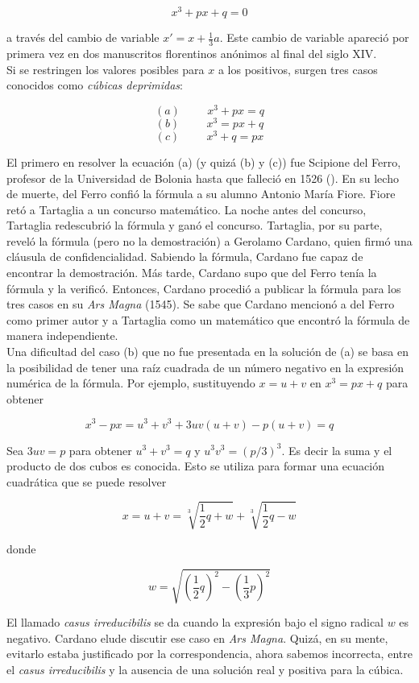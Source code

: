 \documentclass[../main.tex]{memoir}
\begin{document}
$$x^3+px+q = 0$$

a través del cambio de variable $x'  = x + \frac{1}{3}a$. Este cambio de variable apareció por primera vez en dos manuscritos florentinos anónimos al final del siglo XIV. \\

Si se restringen los valores posibles para $x$ a los positivos, surgen tres casos conocidos como \textit{cúbicas deprimidas}:

$$ (a) \hspace{1cm} x^3+px = q $$
$$ (b) \hspace{1cm} x^3 = px+q $$
$$ (c) \hspace{1cm} x^3+q = px $$

El primero en resolver la ecuación (a) (y quizá (b) y (c)) fue Scipione del Ferro, profesor de la Universidad de Bolonia hasta que falleció en 1526 (\cite{mactutor}). En su lecho de muerte, del Ferro confió la fórmula a su alumno Antonio María Fiore. Fiore retó a Tartaglia a un concurso matemático. La noche antes del concurso, Tartaglia redescubrió la fórmula y ganó el concurso. Tartaglia, por su parte, reveló la fórmula (pero no la demostración) a Gerolamo Cardano, quien firmó una cláusula de confidencialidad. Sabiendo la fórmula, Cardano fue capaz de encontrar la demostración. Más tarde, Cardano supo que del Ferro tenía la fórmula y la verificó. Entonces, Cardano procedió a publicar la fórmula para los tres casos en su \textit{Ars Magna} (1545). Se sabe que Cardano mencionó a del Ferro como primer autor y a Tartaglia como un matemático que encontró la fórmula de manera independiente. \\

Una dificultad del caso (b) que no fue presentada en la solución de (a) se basa en la posibilidad de tener una raíz cuadrada de un número negativo en la expresión numérica de la fórmula. Por ejemplo, sustituyendo $x = u+v$ en $x^3=px+q$ para obtener

$$ x^3-px = u^3+v^3+3uv(u+v)-p(u+v) = q$$

Sea $3uv = p$ para obtener $u^3+v^3 = q$ y $u^3 v^3=(p/3)^3$. Es decir la suma y el producto de dos cubos es conocida. Esto se utiliza para formar una ecuación cuadrática que se puede resolver

$$ x = u+v = \sqrt[3]{\frac{1}{2}q+w} + \sqrt[3]{\frac{1}{2}q-w}$$

donde 

$$ w = \sqrt{(\frac{1}{2}q)^2-(\frac{1}{3}p)^2}$$

El llamado \textit{casus irreducibilis} se da cuando la expresión bajo el signo radical $w$ es negativo. Cardano elude discutir ese caso en \textit{Ars Magna}. Quizá, en su mente, evitarlo estaba justificado por la correspondencia, ahora sabemos incorrecta, entre el \textit{casus irreducibilis} y la ausencia de una solución real y positiva para la cúbica. \\
\end{document}
